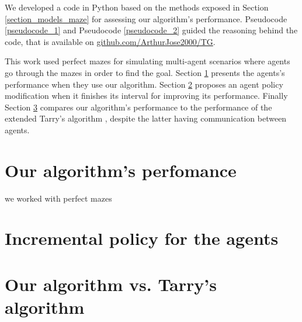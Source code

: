 \label{section_results}
We developed a code in Python based on the methods exposed in Section \ref{section_models_maze} for assessing our algorithm's performance. Pseudocode \ref{pseudocode_1} and Pseudocode \ref{pseudocode_2} guided the reasoning behind the code, that is available on \href{https://github.com/ArthurJose2000/TG}{github.com/ArthurJose2000/TG}.

This work used perfect mazes for simulating multi-agent scenarios where agents go through the mazes in order to find the goal. Section \ref{section_results_our_performance} presents the agents's performance when they use our algorithm. Section \ref{section_results_incremental_policy} proposes an agent policy modification when it finishes its interval for improving its performance. Finally Section \ref{section_results_tarry_vs_our} compares our algorithm's performance to the performance of the extended Tarry's algorithm \cite{KivelevitchCohen2010}, despite the latter having communication between agents.

\section{Our algorithm's perfomance}
\label{section_results_our_performance}

we worked with perfect mazes

\section{Incremental policy for the agents}
\label{section_results_incremental_policy}

\section{Our algorithm vs. Tarry's algorithm}
\label{section_results_tarry_vs_our}